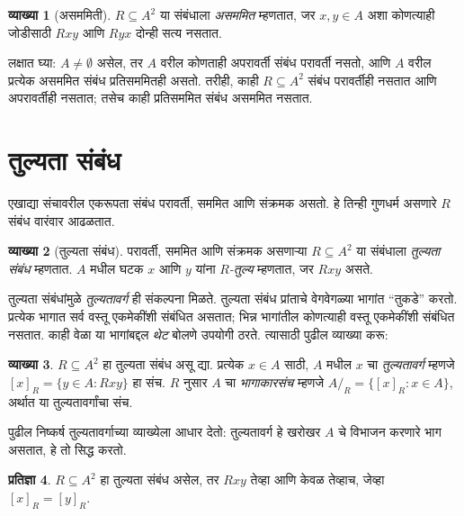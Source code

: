 \documentclass[11pt,a4paper,openany]{book}
\theoremstyle{definition}
\newtheorem{defn}{व्याख्या}[section]
\newtheorem{prop}[defn]{प्रतिज्ञा}
\newcommand{\Setabs}[2]{\{#1:#2\}}
\newcommand{\equivrep}[2]{[#1]_{#2}}
\newcommand{\equivclass}[2]{#1/_{\!{#2}}}
\begin{document}
\begin{defn}[असममिती]
$R \subseteq A^2$ या संबंधाला \emph{असममित} म्हणतात, जर $x,y\in A$ अशा
कोणत्याही जोडीसाठी $Rxy$ आणि $Ryx$ दोन्ही सत्य नसतात.
\end{defn}

लक्षात घ्या: $A \neq \emptyset$ असेल, तर $A$ वरील कोणताही अपरावर्ती
संबंध परावर्ती नसतो, आणि $A$ वरील प्रत्येक असममित संबंध प्रतिसममितही
असतो. तरीही, काही $R \subseteq A^2$ संबंध परावर्तीही नसतात आणि
अपरावर्तीही नसतात; तसेच काही प्रतिसममित संबंध असममित नसतात.












\section{तुल्यता संबंध}\label{sfr:rel:eqv:sec}

एखाद्या संचावरील एकरूपता संबंध परावर्ती, सममित आणि संक्रमक असतो.
हे तिन्ही गुणधर्म असणारे $R$ संबंध वारंवार आढळतात.

\begin{defn}[तुल्यता संबंध]
परावर्ती, सममित आणि संक्रमक असणाऱ्या $R \subseteq A^2$ या संबंधाला
\emph{तुल्यता संबंध} म्हणतात. $A$ मधील घटक $x$ आणि $y$ यांना
\emph{$R$-तुल्य} म्हणतात, जर $Rxy$ असते.
\end{defn}

तुल्यता संबंधांमुळे \emph{तुल्यतावर्ग} ही संकल्पना मिळते. तुल्यता संबंध
प्रांताचे वेगवेगळ्या भागांत ``तुकडे'' करतो. प्रत्येक भागात सर्व वस्तू
एकमेकींशी संबंधित असतात; भिन्न भागांतील कोणत्याही वस्तू एकमेकींशी संबंधित
नसतात. काही वेळा या भागांबद्दल \emph{थेट} बोलणे उपयोगी ठरते. त्यासाठी
पुढील व्याख्या करू:

\begin{defn}\label{sfr:rel:eqv:def:equivalenceclass}
$R \subseteq A^2$ हा तुल्यता संबंध असू द्या. प्रत्येक $x \in A$ साठी,
$A$ मधील $x$ चा \emph{तुल्यतावर्ग} म्हणजे
$\equivrep{x}{R} = \Setabs{y \in A}{Rxy}$ हा संच. $R$ नुसार $A$ चा
\emph{भागाकारसंच} म्हणजे $\equivclass{A}{R} = \Setabs{\equivrep{x}{R}}{x \in A}$,
अर्थात या तुल्यतावर्गांचा संच.
\end{defn}

पुढील निष्कर्ष तुल्यतावर्गाच्या व्याख्येला आधार देतो: तुल्यतावर्ग हे खरोखर
$A$ चे विभाजन करणारे भाग असतात, हे तो सिद्ध करतो.

\begin{prop}
$R \subseteq A^2$ हा तुल्यता संबंध असेल, तर $Rxy$ तेव्हा आणि केवळ
तेव्हाच, जेव्हा $\equivrep{x}{R} = \equivrep{y}{R}$.
\end{prop}
\end{document}
